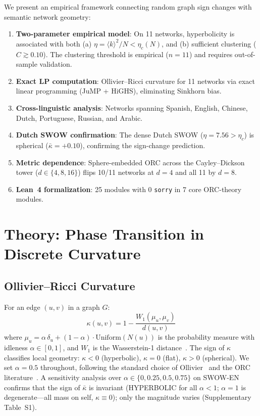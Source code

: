 \documentclass[11pt,a4paper]{article}
\newcommand{\kbar}{\bar{\kappa}}
\newcommand{\kavg}{\langle k \rangle}
\newcommand{\etac}{\eta_c}
\begin{document}
We present an empirical framework connecting random graph sign changes with semantic network geometry:
\begin{enumerate}
    \item \textbf{Two-parameter empirical model}: On 11 networks, hyperbolicity is associated with both (a) $\eta = \kavg^2/N < \etac(N)$, and (b) sufficient clustering ($C \gtrsim 0.10$). The clustering threshold is empirical ($n = 11$) and requires out-of-sample validation.
    \item \textbf{Exact LP computation}: Ollivier--Ricci curvature for 11 networks via exact linear programming (JuMP + HiGHS), eliminating Sinkhorn bias.
    \item \textbf{Cross-linguistic analysis}: Networks spanning Spanish, English, Chinese, Dutch, Portuguese, Russian, and Arabic.
    \item \textbf{Dutch SWOW confirmation}: The dense Dutch SWOW ($\eta = 7.56 > \etac$) is spherical ($\kbar = +0.10$), confirming the sign-change prediction.
    \item \textbf{Metric dependence}: Sphere-embedded ORC across the Cayley--Dickson tower ($d \in \{4,8,16\}$) flips 10/11 networks at $d=4$ and all 11 by $d=8$.
    \item \textbf{Lean~4 formalization}: 25 modules with 0 \texttt{sorry} in 7 core ORC-theory modules.
\end{enumerate}


\section{Theory: Phase Transition in Discrete Curvature}
\label{sec:theory}

\subsection{Ollivier--Ricci Curvature}

For an edge $(u,v)$ in a graph $G$:
\begin{equation}
    \kappa(u,v) = 1 - \frac{W_1(\mu_u, \mu_v)}{d(u,v)}
    \label{eq:orc}
\end{equation}
where $\mu_u = \alpha\,\delta_u + (1-\alpha) \cdot \mathrm{Uniform}(N(u))$ is the probability measure with idleness $\alpha \in [0,1]$, and $W_1$ is the Wasserstein-1 distance~\cite{ollivier2009ricci}. The sign of $\kappa$ classifies local geometry: $\kappa < 0$ (hyperbolic), $\kappa = 0$ (flat), $\kappa > 0$ (spherical). We set $\alpha = 0.5$ throughout, following the standard choice of Ollivier~\cite{ollivier2009ricci} and the ORC literature~\cite{lin2011ricci,jost2014ollivier}. A sensitivity analysis over $\alpha \in \{0, 0.25, 0.5, 0.75\}$ on SWOW-EN confirms that the sign of $\kbar$ is invariant (HYPERBOLIC for all $\alpha < 1$; $\alpha=1$ is degenerate---all mass on self, $\kappa \equiv 0$); only the magnitude varies (Supplementary Table~S1).
\end{document}
